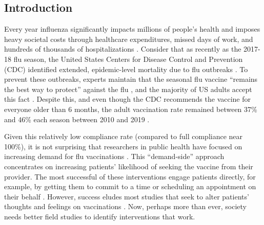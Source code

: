 
\begin{onehalfspace}

\section{Introduction} 
 Every year influenza significantly impacts millions of people’s health and imposes heavy societal costs through healthcare expenditures, missed days of work, and hundreds of thousands of hospitalizations \citep{Molinari2007,CDC2020a}. Consider that as recently as the 2017-18 flu season, the United States Centers for Disease Control and Prevention (CDC) identified extended, epidemic-level mortality due to flu outbreaks \citep{Garten2018}. To prevent these outbreaks, experts maintain that the seasonal flu vaccine “remains the best way to protect” against the flu \citep[p. 544]{Xu2019}, and the majority of US adults accept this fact \citep{NationalFoundationforInfectionsDiseasesNFID2019}. Despite this, and even though the CDC recommends the vaccine for everyone older than 6 months, the adult vaccination rate remained between 37\% and 46\% each season between 2010 and 2019 \citep{CDC2019}.
 
 Given this relatively low compliance rate (compared to full compliance near 100\%), it is not surprising that researchers in public health have focused on increasing demand for flu vaccinations \citep{Brewer2017}. This “demand-side” approach concentrates on increasing patients’ likelihood of seeking the vaccine from their provider. The most successful of these interventions engage patients directly, for example, by getting them to commit to a time \citep{Milkman2011} or scheduling an appointment on their behalf \citep{Chapman2016}. However, success eludes most studies that seek to alter patients’ thoughts and feelings on vaccinations \citep{Brewer2017}. Now, perhaps more than ever, society needs better field studies to identify interventions that work.
 

\end{onehalfspace}
